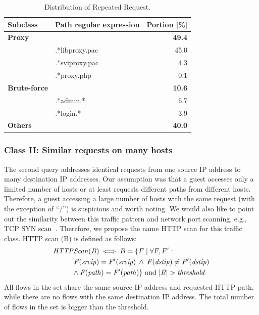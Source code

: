 \begin{table}[ht]
\centering
\begin{tabular}{l l r}
Subclass & Path regular expression & Portion [\%] \\
\hline
\textbf{Proxy} & & \textbf{49.4} \\
& .*libproxy.pac & 45.0 \\
& .*sviproxy.pac &  4.3 \\
& .*proxy.php    &  0.1 \\
\hline
\textbf{Brute-force} & & \textbf{10.6} \\
& .*admin.*            &  6.7 \\
& .*login.*            &  3.9 \\
\hline
\textbf{Others} & & \textbf{40.0} \\
\end{tabular}
\caption{Distribution of Repeated Request.}
\label{tab:httpsecurity-repeat-statistics}
\end{table}

\subsubsection{Class II: Similar requests on many hosts}

The second query addresses identical requests from one source IP address to many destination IP addresses. Our assumption was that a guest accesses only a limited number of hosts or at least requests different paths from different hosts. Therefore, a guest accessing a large number of hosts with the same request (with the exception of ``/'') is suspicious and worth noting. We would also like to point out the similarity between this traffic pattern and network port scanning, e.g., TCP SYN scan~\cite{Bhuyan-2011-Surveying}. Therefore, we propose the name HTTP scan for this traffic class. HTTP scan (B) is defined as follows:
\begin{equation*}
\begin{split}
\mathit{HTTP}&\mathit{Scan(B)} \iff B = \{F \mid \forall F, F':\\
&\mathit{F(srcip) = F'(srcip) \: \land \: F(dstip) \neq F'(dstip)}\\
&\mathit{\land \: F(path) = F'(path) \} \mbox{ and } |B| > threshold}
\end{split}
\end{equation*}
All flows in the set share the same source IP address and requested HTTP path, while there are no flows with the same destination IP address. The total number of flows in the set is bigger than the threshold.

